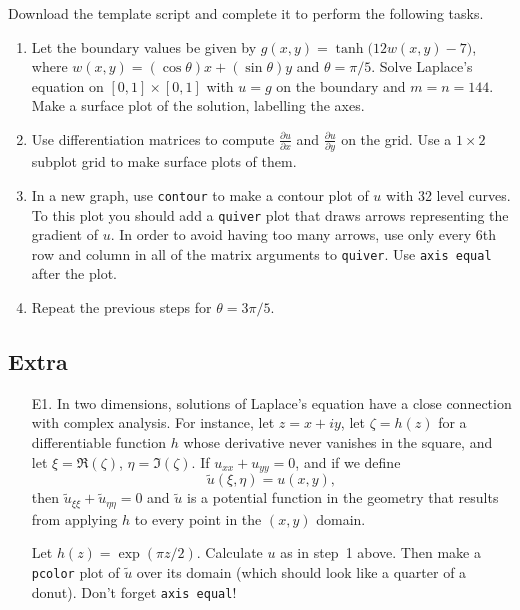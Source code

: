 \documentclass[11pt,twoside]{article}
\newcommand{\pp}[2]{\frac{\partial #1}{\partial #2}}
\begin{document}
Download the template script and complete it to perform the following tasks.

\begin{enumerate}
\item Let the boundary values be given by $g(x,y) = \tanh\bigl(12 w(x,y) - 7\bigr)$, where $w(x,y)=(\cos \theta)x + (\sin \theta)y$ and $\theta=\pi/5$. Solve Laplace's equation on $[0,1]\times[0,1]$ with $u=g$ on the boundary and $m=n=144$. Make a surface plot of the solution, labelling the axes.
  
\item Use differentiation matrices to compute $\pp{u}{x}$ and $\pp{u}{y}$ on the grid. Use a $1\times2$ subplot grid to make surface plots of them.
  
\item In a new graph, use \texttt{contour} to make a contour plot of $u$ with 32 level curves. To this plot you should add a \texttt{quiver} plot that draws arrows representing the gradient of $u$. In order to avoid having too many arrows, use only every 6th row and column in all of the matrix arguments to \texttt{quiver}. Use \texttt{axis equal} after the plot.
  
\item Repeat the previous steps for $\theta=3\pi/5$.
\end{enumerate}

\subsection*{Extra}
\begin{enumerate}
\item[E1.] In two dimensions, solutions of Laplace's equation have a close connection with complex analysis. For instance, let $z=x+iy$, let $\zeta=h(z)$ for a differentiable function $h$ whose derivative never vanishes in the square, and let $\xi=\Re(\zeta)$, $\eta=\Im(\zeta)$. If $u_{xx}+u_{yy}=0$, and if we define
\[
\tilde{u}(\xi,\eta) = u(x,y),
\]
then $\tilde{u}_{\xi\xi} + \tilde{u}_{\eta\eta}=0$ and $\tilde{u}$ is a potential function in the geometry that results from applying $h$ to every point in the $(x,y)$ domain.

Let $h(z)=\exp(\pi z/2)$. Calculate $u$ as in step~1 above. Then make a \texttt{pcolor} plot of $\tilde{u}$ over its domain (which should look like a quarter of a donut). Don't forget \texttt{axis equal}!
\end{enumerate}
\end{document}
